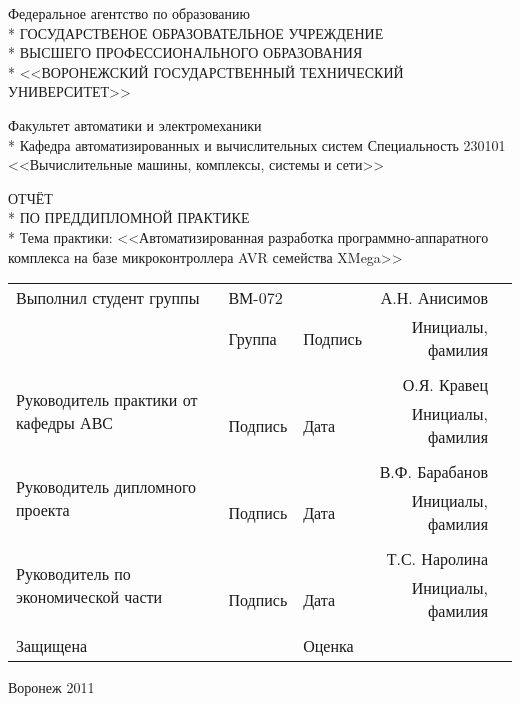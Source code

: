\begin{center}
Федеральное агентство по образованию \\*
ГОСУДАРСТВЕНОЕ ОБРАЗОВАТЕЛЬНОЕ УЧРЕЖДЕНИЕ \\*
ВЫСШЕГО ПРОФЕССИОНАЛЬНОГО ОБРАЗОВАНИЯ \\*
<<ВОРОНЕЖСКИЙ ГОСУДАРСТВЕННЫЙ ТЕХНИЧЕСКИЙ УНИВЕРСИТЕТ>> \\
\end{center}
\begin{center}
Факультет  автоматики и электромеханики \\*
Кафедра автоматизированных и вычислительных систем
Специальность 230101 <<Вычислительные машины, комплексы, системы и сети>>
\end{center}

\vspace{0.2em}

\begin{center}
ОТЧЁТ \\*
ПО ПРЕДДИПЛОМНОЙ ПРАКТИКЕ \\*
Тема практики: <<Автоматизированная разработка программно-аппаратного комплекса
на базе микроконтроллера AVR семейства XMega>>
\end{center}

\vspace{1em}

\begin{tabular}{p{12em}p{5em}@{}p{5em}@{}r@{}r}
Выполнил студент группы & \hrulefill{} ВМ-072 & \hrulefill{}  & \hrulefill{} А.Н. Анисимов \\
 &  \small{Группа}  & \small{Подпись} &\small{Инициалы, фамилия} \\
& & & \\
\multirow{2}{12em}{Руководитель практики\newline{} от кафедры АВС} & \hrulefill{} & \hrulefill{} & \hrulefill{} О.Я. Кравец \\
 & \small{Подпись}  & \small{Дата} & \small{Инициалы, фамилия} \\
 & & & \\
\multirow{2}{12em}{Руководитель дипломного  проекта} & \hrulefill{} & \hrulefill{} & \hrulefill{} В.Ф. Барабанов \\
 & \small{Подпись}  & \small{Дата} & \small{Инициалы, фамилия} \\
& & & \\
\multirow{2}{12em}{Руководитель по экономической части} & \hrulefill{} & \hrulefill{} & \hrulefill{} Т.С. Наролина \\
 & \small{Подпись}  & \small{Дата} & \small{Инициалы, фамилия} \\
& & & \\
Защищена \hrulefill{} &  & Оценка \hrulefill{} & \hrulefill{} 
\end{tabular}

\vspace{1.5em}

\begin{center}Воронеж 2011\end{center}
